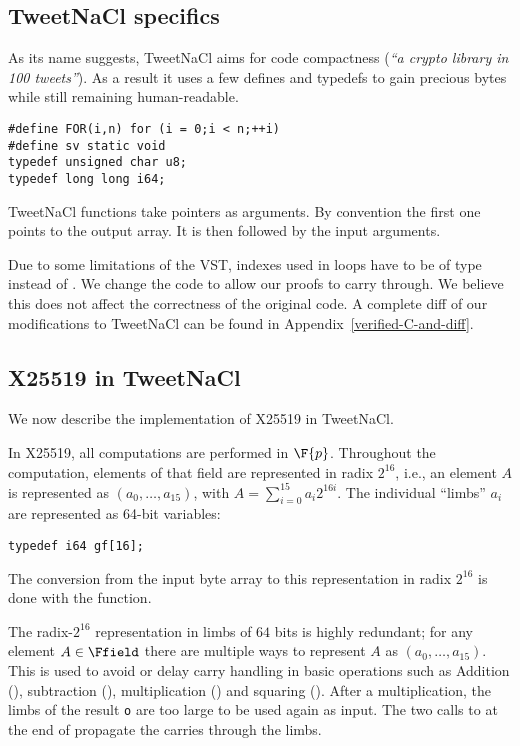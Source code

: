 \subsection{TweetNaCl specifics}
\label{subsec:Number-TweetNaCl}

As its name suggests, TweetNaCl aims for code compactness (\emph{``a crypto library in 100 tweets''}).
As a result it uses a few defines and typedefs to gain precious bytes while
still remaining human-readable.
\begin{lstlisting}[language=Ctweetnacl,stepnumber=0]
#define FOR(i,n) for (i = 0;i < n;++i)
#define sv static void
typedef unsigned char u8;
typedef long long i64;
\end{lstlisting}

TweetNaCl functions take pointers as arguments. By convention the first one
points to the output array. It is then followed by the input arguments.

Due to some limitations of the VST, indexes used in  loops have to be
of type  instead of . We change the code to allow our
proofs to carry through. We believe this does not affect the correctness of the
original code. A complete diff of our modifications to TweetNaCl can be found in
Appendix~\ref{verified-C-and-diff}.


\subsection{X25519 in TweetNaCl}
\label{subsec:X25519-TweetNaCl}

We now describe the implementation of X25519 in TweetNaCl.

In X25519, all computations are performed in $\F{p}$.
Throughout the computation, elements of that field
are represented in radix $2^{16}$,
i.e., an element $A$ is represented as $(a_0,\dots,a_{15})$,
with $A = \sum_{i=0}^{15}a_i2^{16i}$.
The individual ``limbs'' $a_i$ are represented as
64-bit  variables:
\begin{lstlisting}[language=Ctweetnacl,stepnumber=0]
typedef i64 gf[16];
\end{lstlisting}

The conversion from the input byte array to this representation in radix
$2^{16}$ is done with the  function.

The radix-$2^{16}$ representation in limbs of $64$ bits is
highly redundant; for any element $A \in \Ffield$ there are
multiple ways to represent $A$ as $(a_0,\dots,a_{15})$.
This is used to avoid or delay carry handling in basic operations such as
Addition (), subtraction (), multiplication ()
and squaring (). After a multiplication, the limbs of the result
\texttt{o} are too large to be used again as input. The two calls to
 at the end of  propagate the carries through
the limbs.

